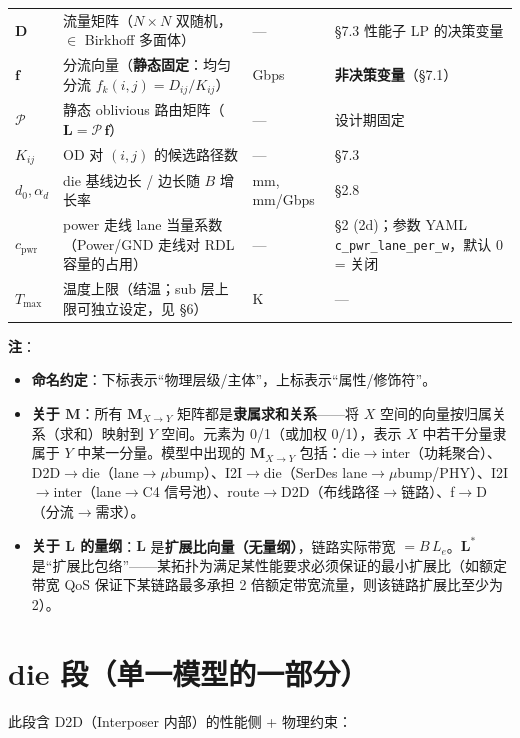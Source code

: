 \documentclass[11pt]{article}
\newcommand{\bv}{\mathbf}
\newcommand{\Pmat}{\mathcal{P}}
\begin{document}
\begin{longtable}{@{}p{4.0cm}p{7.6cm}p{1.4cm}p{3.5cm}@{}}
$\bv{D}$ &
流量矩阵（$N \times N$ 双随机，$\in$ Birkhoff 多面体） & — & §7.3 性能子 LP 的决策变量 \\
$\bv{f}$ &
分流向量（\textbf{静态固定}：均匀分流 $f_k(i,j) = D_{ij}/K_{ij}$） & Gbps & \textbf{非决策变量}（§7.1） \\
$\Pmat$ &
静态 oblivious 路由矩阵（$\bv{L} = \Pmat\,\bv{f}$） & — & 设计期固定 \\
$K_{ij}$ &
OD 对 $(i,j)$ 的候选路径数 & — & §7.3 \\
$d_0, \alpha_d$ &
die 基线边长 / 边长随 $B$ 增长率 & mm, mm/Gbps & §2.8 \\
$c_{\text{pwr}}$ &
power 走线 lane 当量系数（Power/GND 走线对 RDL 容量的占用） & — & §2 (2d)；参数 YAML \texttt{c\_pwr\_lane\_per\_w}，默认 0 = 关闭 \\
$T_{\max}$ &
温度上限（结温；sub 层上限可独立设定，见 §6） & K & — \\
\bottomrule
\end{longtable}

\textbf{注}：
\begin{itemize}
\item \textbf{命名约定}：下标表示“物理层级/主体”，上标表示“属性/修饰符”。
\item \textbf{关于 $\bv{M}$}：所有 $\bv{M}_{X \to Y}$ 矩阵都是\textbf{隶属求和关系}——将 $X$ 空间的向量按归属关系（求和）映射到 $Y$ 空间。元素为 0/1（或加权 0/1），表示 $X$ 中若干分量隶属于 $Y$ 中某一分量。模型中出现的 $\bv{M}_{X \to Y}$ 包括：die$\to$inter（功耗聚合）、D2D$\to$die（lane$\to$$\mu$bump）、I2I$\to$die（SerDes lane$\to$$\mu$bump/PHY）、I2I$\to$inter（lane$\to$C4 信号池）、route$\to$D2D（布线路径$\to$链路）、f$\to$D（分流$\to$需求）。
\item \textbf{关于 $\bv{L}$ 的量纲}：$\bv{L}$ 是\textbf{扩展比向量（无量纲）}，链路实际带宽 $= B\,L_e$。$\bv{L}^*$ 是“扩展比包络”——某拓扑为满足某性能要求必须保证的最小扩展比（如额定带宽 QoS 保证下某链路最多承担 2 倍额定带宽流量，则该链路扩展比至少为 2）。
\end{itemize}

\section{die 段（单一模型的一部分）}

此段含 D2D（Interposer 内部）的性能侧 + 物理约束：
\end{document}
